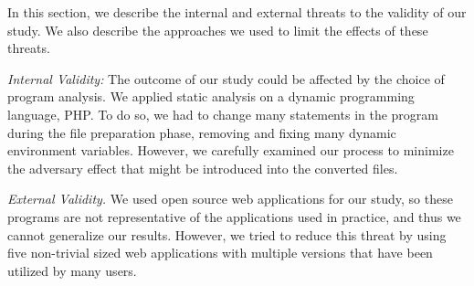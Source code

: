 In this section, we describe the internal and external
threats to the validity of our study. We also describe 
the approaches we used to limit the effects of these threats.

{\em Internal Validity:}
The outcome of our study could be affected by the choice of 
program analysis. We applied static analysis on a dynamic programming 
language, PHP. To do so, we had to change many statements in the 
program during the file preparation phase, removing and fixing 
many dynamic environment variables. However, we carefully examined 
our process to minimize the adversary effect that might be introduced
into the converted files.  

{\em External Validity.}
We used open source web applications for our study, so these programs 
are not representative of the applications used in practice, and thus
we cannot generalize our results. However, we tried to reduce this 
threat by using five non-trivial sized web applications with multiple 
versions that have been utilized by many users. 


